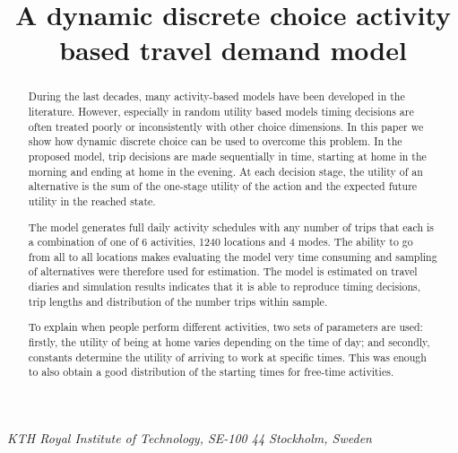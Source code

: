 \documentclass[final,pdftex]{Oskarthesis}
\numberwithin{equation}{section}
\begin{document}
\begin{frontmatter}
	\title{A dynamic discrete choice activity based travel demand model}
	
	
	\begin{aug}
		\author{ }
		\author{ }
		\author{ }
		\author{ }
		\vspace{0.2cm}
		
		{\centering \footnotesize\emph{KTH Royal Institute of Technology, SE-100 44 Stockholm, Sweden}}
		
		
		\address{Corresponding author: }

	\end{aug}
	\def\abstractname{}
	\begin{abstract}
During the last decades, many activity-based models have been developed in the literature. However, especially in random utility based models timing decisions are often treated poorly or inconsistently with other choice dimensions. In this paper we show how dynamic discrete choice can be used to overcome this problem. In the proposed model, trip decisions are made sequentially in time, starting at home in the morning and ending at home in the evening. At each decision stage, the utility of an alternative is the sum of the one-stage utility of the action and the expected future utility in the reached state.

The model generates full daily activity schedules with any number of trips that each is a combination of one of 6 activities, 1240 locations and 4 modes. The ability to go from all to all locations makes evaluating the model very time consuming and sampling of alternatives were therefore used for estimation. The model is estimated on travel diaries and simulation results indicates that it is able to reproduce timing decisions, trip lengths and distribution of the number trips within sample. 

To explain when people perform different activities, two sets of parameters are used: firstly, the utility of being at home varies depending on the time of day; and secondly, constants determine the utility of arriving to work at specific times. This was enough to also obtain a good distribution of the starting times for free-time activities. 

	\end{abstract}
\end{frontmatter}
\end{document}
